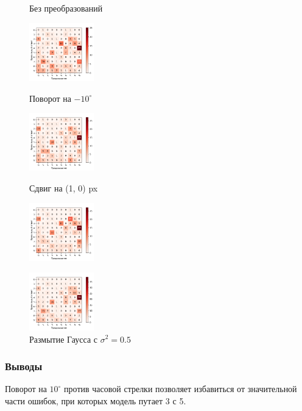 \documentclass[a4paper, 11pt]{article}
\begin{document}
    \begin{figure}[h]
        \begin{multicols}{4} 
            \caption{Без преобразований} \label{exp6:without}
            \includegraphics[width=0.25\textwidth]{../conf_matrix_experiment_4.pdf}
            \caption{Поворот на $-10^{\circ}$} \label{exp6:rotate}
            \includegraphics[width=0.25\textwidth]{../conf_matrix_experiment_6_with_rotate_-10.pdf}
            \caption{Сдвиг на (1, 0) px} \label{exp6:shift}
            \includegraphics[width=0.25\textwidth]{../conf_matrix_experiment_6_with_shift_1_0.pdf}
            \caption{Размытие Гаусса с $\sigma^2 = 0.5$} \label{exp6:blur}
            \includegraphics[width=0.25\textwidth]{../conf_matrix_experiment_6_with_blur_05.pdf}
        \end{multicols}
    \end{figure}
    \subsubsection{Выводы}
    Поворот на $10^\circ$ против часовой стрелки позволяет избавиться от значительной части ошибок, при которых модель путает 3 с 5.
    
\end{document}
